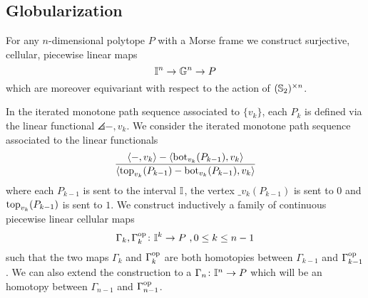 %
%
%

\subsection{Globularization} \label{ss:globularization}

For any $n$-dimensional polytope $P$ with a Morse frame we construct surjective, cellular, piecewise linear maps
\[
\mathbb{I}^n \to \mathbb{G}^n \to P
\]
which are moreover equivariant with respect to the action of $(\mathbb{S}_2)^{\times n}$.

In the iterated monotone path sequence associated to $\{v_k\}$, each $P_k$ is defined via the linear functional $\angles{-,v_k}$.
We consider the iterated monotone path sequence associated to the linear functionals
\begin{equation} \label{eq:new-projection}
	\frac{\langle-,v_k\rangle-\langle\operatorname{bot}_{v_k}(P_{k-1}),v_k\rangle}{\langle\operatorname{top}_{v_k}(P_{k-1})-\operatorname{bot}_{v_k}(P_{k-1}),v_k\rangle}
\end{equation}
where each $P_{k-1}$ is sent to the interval $\mathbb{I}$, the vertex $\bm_{v_k}(P_{k-1})$ is sent to $0$ and $\operatorname{top}_{v_k}(P_{k-1})$ is sent to $1$.
We construct inductively a family of continuous piecewise linear cellular maps
\[
\Gamma_k, \Gamma_k^{\mathrm{op}} \colon \mathbb{I}^k \to P \ , 0 \leq k \leq n-1
\]
such that the two maps $\Gamma_k$ and $\Gamma_k^{\mathrm{op}}$ are both homotopies between $\Gamma_{k-1}$ and $\Gamma_{k-1}^{\mathrm{op}}$.
We can also extend the construction to a $\Gamma_n \colon \mathbb{I}^n \to P$ which will be an homotopy between $\Gamma_{n-1}$ and $\Gamma_{n-1}^{\mathrm{op}}$.

